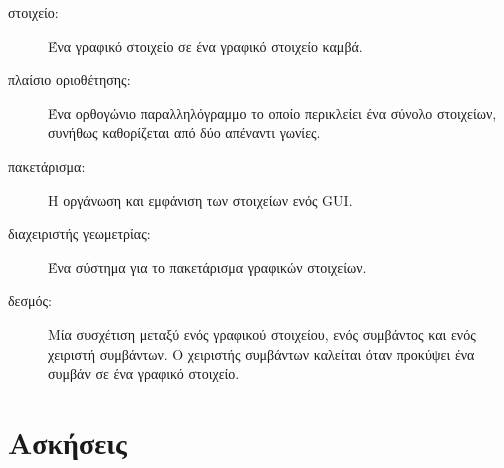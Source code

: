\documentclass[10pt]{book}
\begin{document}
\begin{description}
\item[στοιχείο:] Ένα γραφικό στοιχείο σε ένα γραφικό στοιχείο καμβά.

\item[πλαίσιο οριοθέτησης:] Ένα ορθογώνιο παραλληλόγραμμο το οποίο περικλείει ένα σύνολο 
στοιχείων, συνήθως καθορίζεται από δύο απέναντι γωνίες.

\item[πακετάρισμα:] Η οργάνωση και εμφάνιση των στοιχείων ενός GUI. 

\item[διαχειριστής γεωμετρίας:] Ένα σύστημα για το πακετάρισμα γραφικών στοιχείων.

\item[δεσμός:] Μία συσχέτιση μεταξύ ενός γραφικού στοιχείου, ενός συμβάντος και ενός χειριστή συμβάντων.
Ο χειριστής συμβάντων καλείται όταν προκύψει ένα συμβάν σε ένα γραφικό στοιχείο.

\end{description}


\section{Ασκήσεις}
\end{document}
